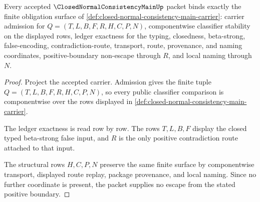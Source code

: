 \begin{theorem}
\label{thm:closed-normal-consistency-main-namecert-obligations}
Every accepted $\ClosedNormalConsistencyMainUp$ packet binds exactly the finite obligation surface of \autoref{def:closed-normal-consistency-main-carrier}: carrier admission for $Q=(T,L,B,F,R,H,C,P,N)$, componentwise classifier stability on the displayed rows, ledger exactness for the typing, closedness, beta-strong, false-encoding, contradiction-route, transport, route, provenance, and naming coordinates, positive-boundary non-escape through $R$, and local naming through $N$.
\end{theorem}
\begin{proof}
Project the accepted carrier. Admission gives the finite tuple $Q=(T,L,B,F,R,H,C,P,N)$, so every public classifier comparison is componentwise over the rows displayed in \autoref{def:closed-normal-consistency-main-carrier}.

The ledger exactness is read row by row. The rows $T,L,B,F$ display the closed typed beta-strong false input, and $R$ is the only positive contradiction route attached to that input.

The structural rows $H,C,P,N$ preserve the same finite surface by componentwise transport, displayed route replay, package provenance, and local naming. Since no further coordinate is present, the packet supplies no escape from the stated positive boundary.
\end{proof}

